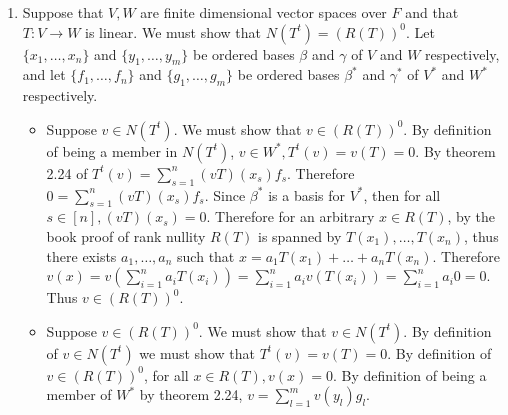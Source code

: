 \documentclass[12pt, letterpaper]{article}
\begin{document}
\begin{enumerate}
		\item Suppose that $V,W$ are finite dimensional vector spaces over $F$ and that $T: V \to W$ is linear.  We must show that $N(T^t) = (R(T))^0$.  Let $\{x_1,\ldots,x_n\}$ and $\{y_1,\ldots,y_m\}$ be ordered bases $\beta$ and $\gamma$ of $V$ and $W$ respectively, and let $\{f_1,\ldots,f_n\}$ and $\{g_1,\ldots,g_m\}$ be ordered bases $\beta^*$ and $\gamma^*$ of $V^*$ and $W^*$ respectively.    
		\begin{itemize}
			\item Suppose $v \in N(T^t)$.  We must show that $v \in (R(T))^0$.  By definition of being a member in $N(T^t)$, $v \in W^*, T^t (v) = v(T) = 0$.  By theorem 2.24 of $T^t (v) = \sum_{s = 1}^n (v T)(x_s) f_s$.  Therefore $0 = \sum_{s = 1}^n (v T)(x_s) f_s$.  Since $\beta^*$ is a basis for $V^*$, then for all $s \in [n], (v T)(x_s) = 0$.  Therefore for an arbitrary $x \in R(T)$, by the book proof of rank nullity $R(T)$ is spanned by $T(x_1),\ldots, T(x_n)$, thus there exists $a_1,\ldots, a_n$ such that  $x = a_1 T(x_1) + \ldots + a_n T(x_n)$.  Therefore $v(x) = v(\sum_{i=1}^n a_i T(x_i)) = \sum_{i=1}^n a_i v(T(x_i)) = \sum_{i=1}^n a_i 0 = 0$.  Thus $v \in (R(T))^0$.
			\item Suppose $v \in (R(T))^0 $.  We must show that $v \in N(T^t)$.  By definition of $v \in N(T^t)$ we must show that $T^t (v) = v(T) = 0$.  By definition of $v \in (R(T))^0$, for all $x \in R(T), v(x) = 0$.  By definition of being a member of $W^*$ by theorem 2.24, $v = \sum_{l = 1}^m v(y_l)g_l$.  
\end{itemize}		 
	\end{enumerate}
\end{document}

